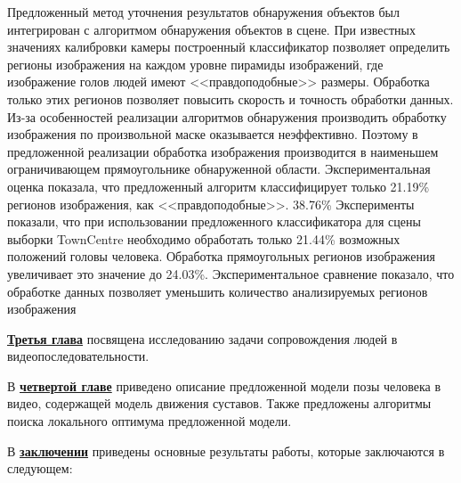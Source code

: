Предложенный метод уточнения результатов обнаружения объектов был интегрирован с алгоритмом обнаружения объектов в сцене. При известных значениях калибровки камеры построенный классификатор позволяет определить регионы изображения на каждом уровне пирамиды изображений, где изображение голов людей имеют <<правдоподобные>> размеры. Обработка только этих регионов позволяет повысить скорость и точность обработки данных. Из-за особенностей реализации алгоритмов обнаружения производить обработку изображения по произвольной маске оказывается неэффективно. Поэтому в предложенной реализации обработка изображения производится в наименьшем ограничивающем прямоугольнике обнаруженной области. Экспериментальная оценка показала, что предложенный алгоритм классифицирует только 21.19\% регионов изображения, как <<правдоподобные>>. 38.76\% Эксперименты показали, что при использовании предложенного классификатора для сцены выборки TownCentre \cite{benfold2011stable} необходимо обработать только 21.44\% возможных положений головы человека. Обработка прямоугольных регионов изображения увеличивает это значение до 24.03\%. Экспериментальное сравнение показало, что  обработке данных позволяет уменьшить количество анализируемых регионов изображения 

\underline{\textbf{Третья глава}} посвящена исследованию задачи сопровождения людей в видеопоследовательности.

В \underline{\textbf{четвертой главе}} приведено описание предложенной модели позы человека в видео, содержащей модель движения суставов. Также предложены алгоритмы поиска локального оптимума предложенной модели.

В \underline{\textbf{заключении}} приведены основные результаты работы, которые заключаются в следующем:


\iffalse
При использовании пакета \verb!biblatex! список публикаций автора по теме
диссертации формируется в разделе <<\publications>>\ файла
\verb!../common/characteristic.tex!  при помощи команды \verb!\nocite! 
\fi


